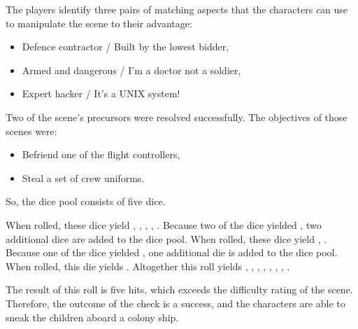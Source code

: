 \documentclass[12pt, a5paper, parskip=half-]{scrartcl}
\begin{document}
The players identify three pairs of matching aspects that the characters can use to manipulate the scene to their advantage:
\begin{itemize}[leftmargin=\widthof{\hspace{0.25cm}\textbullet\space}, noitemsep, topsep=-1ex]
\item Defence contractor / Built by the lowest bidder,
\item Armed and dangerous / I'm a doctor not a soldier,
\item Expert hacker / It's a UNIX system!
\end{itemize}
\vspace{1ex}
Two of the scene's precursors were resolved successfully. The objectives of those scenes were:
\begin{itemize}[leftmargin=\widthof{\hspace{0.25cm}\textbullet\space}, nosep, topsep=-1ex]
\item Befriend one of the flight controllers,
\item Steal a set of crew uniforms.
\end{itemize}
\vspace{1ex}
So, the dice pool consists of five dice.

When rolled, these dice yield , , , ,  .%
Because two of the dice yielded , two additional dice are added to the dice pool.
When rolled, these dice yield , .%
Because one of the dice yielded , one additional die is added to the dice pool.
When rolled, this die yields .
Altogether this roll yields , , , , , , , .%

The result of this roll is five hits, which exceeds the difficulty rating of the scene.
Therefore, the outcome of the check is a success, and the characters are able to sneak the children aboard a colony ship.
\end{document}
